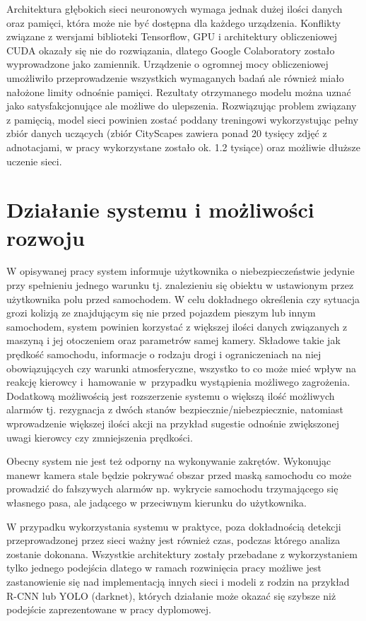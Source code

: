 \hspace{0.5cm}
Architektura głębokich sieci neuronowych wymaga jednak dużej ilości danych oraz pamięci, która może nie być dostępna dla każdego urządzenia. Konflikty związane z wersjami biblioteki Tensorflow, GPU i architektury obliczeniowej CUDA okazały się nie do rozwiązania, dlatego Google Colaboratory zostało wyprowadzone jako zamiennik. Urządzenie o ogromnej mocy obliczeniowej umożliwiło przeprowadzenie wszystkich wymaganych badań ale również miało nałożone limity odnośnie pamięci. Rezultaty otrzymanego modelu można uznać jako satysfakcjonujące ale możliwe do ulepszenia. Rozwiązując problem związany z pamięcią, model sieci powinien zostać poddany treningowi wykorzystując pełny zbiór danych uczących (zbiór CityScapes zawiera ponad 20 tysięcy zdjęć z adnotacjami, w pracy wykorzystane zostało ok. 1.2 tysiące) oraz możliwie dłuższe uczenie sieci.

\section{Działanie systemu i możliwości rozwoju}
\hspace{0.5cm}
W opisywanej pracy system informuje użytkownika o niebezpieczeństwie jedynie przy spełnieniu jednego warunku tj. znalezieniu się obiektu w ustawionym przez użytkownika polu przed samochodem. W celu dokładnego określenia czy sytuacja grozi kolizją ze znajdującym się nie przed pojazdem pieszym lub innym samochodem, system powinien korzystać z większej ilości danych związanych z maszyną i jej otoczeniem oraz parametrów samej kamery. Składowe takie jak prędkość samochodu, informacje o rodzaju drogi i ograniczeniach na niej obowiązujących czy warunki atmosferyczne, wszystko to co może mieć wpływ na reakcję kierowcy i~hamowanie w~przypadku wystąpienia możliwego zagrożenia. Dodatkową możliwością jest rozszerzenie systemu o większą ilość możliwych alarmów tj. rezygnacja z dwóch stanów bezpiecznie/niebezpiecznie, natomiast wprowadzenie większej ilości akcji na przykład sugestie odnośnie zwiększonej uwagi kierowcy czy zmniejszenia prędkości.

\hspace{0.5cm}
Obecny system nie jest też odporny na wykonywanie zakrętów. Wykonując manewr kamera stale będzie pokrywać obszar przed maską samochodu co może prowadzić do fałszywych alarmów np. wykrycie samochodu trzymającego się własnego pasa, ale jadącego w przeciwnym kierunku do użytkownika.

\hspace{0.5cm}
W przypadku wykorzystania systemu w praktyce, poza dokładnością detekcji przeprowadzonej przez sieci ważny jest również czas, podczas którego analiza zostanie dokonana. Wszystkie architektury zostały przebadane z wykorzystaniem tylko jednego podejścia dlatego w ramach rozwinięcia pracy możliwe jest zastanowienie się nad implementacją innych sieci i modeli z rodzin na przykład R-CNN lub YOLO (darknet), których działanie może okazać się szybsze niż podejście zaprezentowane w pracy dyplomowej.